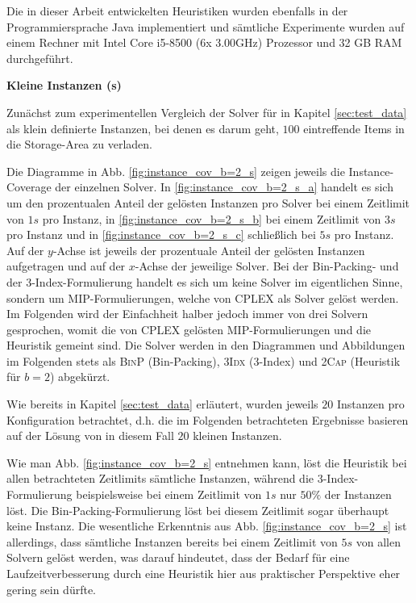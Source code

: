 Die in dieser Arbeit entwickelten Heuristiken wurden ebenfalls in der Programmiersprache Java implementiert
und sämtliche Experimente wurden auf einem Rechner mit Intel Core i5-8500 (6x 3.00GHz) Prozessor und 32 GB RAM durchgeführt.

\pagebreak

\textbf{Kleine Instanzen (s)}

Zunächst zum experimentellen Vergleich der Solver für in Kapitel \ref{sec:test_data} als klein definierte Instanzen,
bei denen es darum geht, $100$ eintreffende Items in die Storage-Area zu verladen.

Die Diagramme in Abb. \ref{fig:instance_cov_b=2_s} zeigen jeweils die Instance-Coverage der einzelnen Solver.
In \ref{fig:instance_cov_b=2_s_a} handelt es sich um den prozentualen Anteil der gelösten Instanzen pro Solver bei einem Zeitlimit
von $1s$ pro Instanz, in \ref{fig:instance_cov_b=2_s_b} bei einem Zeitlimit von $3s$ pro Instanz und in \ref{fig:instance_cov_b=2_s_c}
schließlich bei $5s$ pro Instanz.\newline
Auf der $y$-Achse ist jeweils der prozentuale Anteil der gelösten Instanzen aufgetragen und auf der $x$-Achse der jeweilige Solver.
Bei der Bin-Packing- und der 3-Index-Formulierung handelt es sich um keine Solver im eigentlichen Sinne,
sondern um MIP-Formulierungen, welche von CPLEX als Solver gelöst werden.
Im Folgenden wird der Einfachheit halber jedoch immer von drei Solvern gesprochen, womit die von
CPLEX gelösten MIP-Formulierungen und die Heuristik gemeint sind.
Die Solver werden in den Diagrammen und Abbildungen im Folgenden stets als \textsc{BinP} (Bin-Packing),
\textsc{3Idx} (3-Index) und \textsc{2Cap} (Heuristik für $b = 2$) abgekürzt.

Wie bereits in Kapitel \ref{sec:test_data} erläutert, wurden jeweils $20$ Instanzen pro Konfiguration betrachtet,
d.h. die im Folgenden betrachteten Ergebnisse basieren auf der Lösung von in diesem Fall $20$ kleinen Instanzen.

Wie man Abb. \ref{fig:instance_cov_b=2_s} entnehmen kann, löst die Heuristik bei allen betrachteten Zeitlimits sämtliche Instanzen,
während die 3-Index-Formulierung beispielsweise bei einem Zeitlimit von $1s$ nur $50 \%$ der Instanzen löst.
Die Bin-Packing-Formulierung löst bei diesem Zeitlimit sogar überhaupt keine Instanz.\newline
Die wesentliche Erkenntnis aus Abb. \ref{fig:instance_cov_b=2_s} ist allerdings, dass sämtliche Instanzen bereits bei einem Zeitlimit von $5s$
von allen Solvern gelöst werden, was darauf hindeutet, dass der Bedarf für eine Laufzeitverbesserung durch eine Heuristik hier
aus praktischer Perspektive eher gering sein dürfte.

